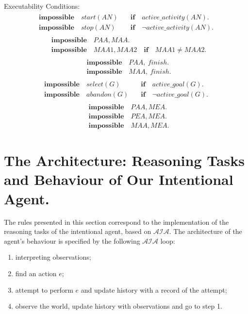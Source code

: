 \documentclass[11pt, oneside]{article}
\begin{document}
Executability Conditions:
\begin{align}\begin{split}
\mathbf{impossible}\quad  start(AN)\quad  & \mathbf{if}\quad active\_activity(AN). \\
\mathbf{impossible}\quad  stop(AN)\ \quad  & \mathbf{if}\quad  \neg active\_activity(AN). 
\end{split}\end{align}
\begin{align}\begin{split}
&\mathbf{impossible}\quad  PAA, MAA. \\
&\mathbf{impossible}\quad  MAA1, MAA2\quad \mathbf{if} \quad MAA1\neq MAA2.
\end{split}\end{align}
\begin{align}\begin{split}
&\mathbf{impossible}\quad  PAA, \ finish. \\
&\mathbf{impossible}\quad  MAA, \ finish.
\end{split}\end{align}
\begin{align}\begin{split}
\mathbf{impossible}\quad select(G)\ \ \ \:\quad &\mathbf{if} \quad active\_goal(G). \\
\mathbf{impossible}\quad abandon(G) \quad &\mathbf{if} \quad \neg active\_goal(G). 
\end{split}\end{align}
\begin{align}\begin{split}
&\mathbf{impossible}\quad  PAA, MEA. \\
&\mathbf{impossible}\quad  PEA, MEA. \\
&\mathbf{impossible}\quad  MAA, MEA. 
\end{split}\end{align}

\section{The Architecture: Reasoning Tasks and Behaviour of Our Intentional Agent.} 
The rules presented in this section correspond to the implementation of the reasoning tasks of the intentional agent, based on $\mathcal{AIA}$. The architecture of the agent's behaviour is specified by the following $\mathcal{AIA}$ loop:
\begin{enumerate}
\item interpreting observations;
\item find an  action $e$;
\item attempt to perform $e$ and update history with a record of the attempt;
\item observe the world, update history with observations and go to step 1.
\end{enumerate}
\end{document}
